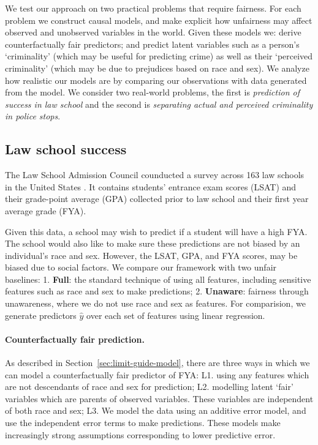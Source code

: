 We test our approach on two practical problems that require  fairness. For each problem we construct causal models, and make explicit how unfairness may affect observed and unobserved variables in the world. Given these models we: derive counterfactually fair predictors; and predict latent variables such as a person's `criminality' (which may be useful for predicting crime) as well as their `perceived criminality' (which may be due to prejudices based on race and sex). We analyze how realistic our models are by comparing our observations with data generated from the model. We consider two real-world problems, the first is \emph{prediction of success in law school} and the second is \emph{separating actual and perceived criminality in police stops}.

\subsection{Law school success}
\label{sec:law-school-success}
The Law School Admission Council
counducted a survey across 163 law
schools in the United States \cite{wightman1998lsac}. %
It contains students'  entrance exam scores (LSAT) and their grade-point
average (GPA) collected prior to law school and their first year average grade
(FYA). %

Given this data, a  school may wish to predict if a  student will
have a high FYA. %
The school would also like to make sure these
predictions are not biased by an individual's race and sex. However,
the LSAT, GPA, and FYA scores, may be biased due to social factors. %
We compare our framework with
two unfair baselines: 1. \textbf{Full}: the standard technique of
using all features, including sensitive features such as race and sex
to make predictions; 2. \textbf{Unaware}: fairness through
unawareness, where we do not use race and sex as features. For comparision, we generate predictors $\hat y$
over each set of features using linear regression.

\paragraph{Counterfactually fair prediction.}
As described in Section~\ref{sec:limit-guide-model},  there are three ways in which we can model a counterfactually fair predictor of FYA: L1. using any features which are not descendants of race and sex for prediction; L2. modelling latent `fair' variables which are parents of observed variables. These variables are independent of both race and sex; L3. We model the data using an additive error model, and use the independent error terms to make predictions. These models make increasingly strong assumptions corresponding to lower predictive error.

